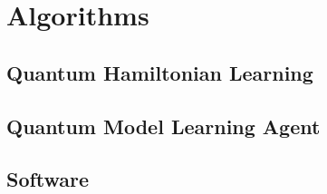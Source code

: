 
%         

%         
%         
%         

\part{Algorithms}\label{part:algorithms}
    \chapter{Quantum Hamiltonian Learning}\label{chapter:qhl}
        
    \chapter{Quantum Model Learning Agent}\label{chapter:qmla}
        
    \chapter{Software}\label{chapter:sw}
        

